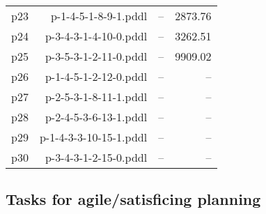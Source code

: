 \documentclass{article}
\begin{document}
\begin{center}
\begin{tabular}{@{}l|r|r|r@{}}
  p23& p-1-4-5-1-8-9-1.pddl&--&2873.76\\
  p24& p-3-4-3-1-4-10-0.pddl&--&3262.51\\
  p25& p-3-5-3-1-2-11-0.pddl&--&9909.02\\
  p26& p-1-4-5-1-2-12-0.pddl&--&--\\
  p27& p-2-5-3-1-8-11-1.pddl&--&--\\
  p28& p-2-4-5-3-6-13-1.pddl&--&--\\
  p29& p-1-4-3-3-10-15-1.pddl&--&--\\
  p30& p-3-4-3-1-2-15-0.pddl&--&--
                            \end{tabular}
                            \end{center}
                    

                    \subsection*{Tasks for agile/satisficing planning}
                    
\end{document}
